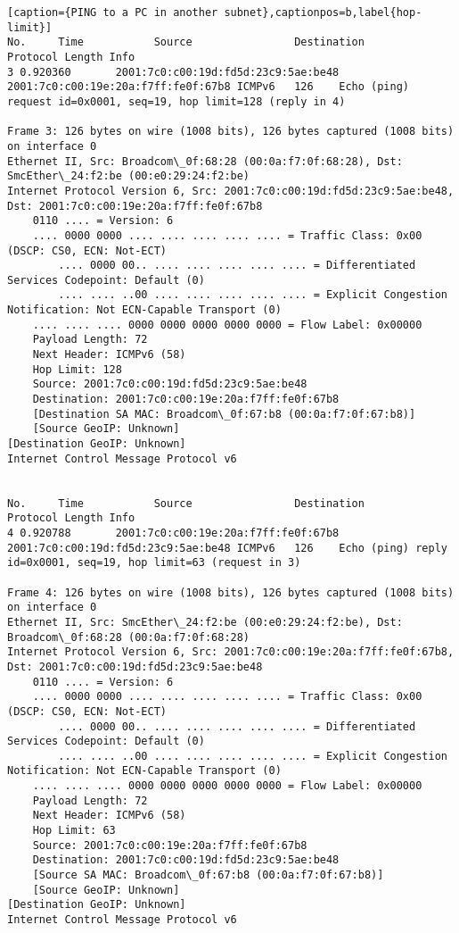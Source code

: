 \begin{lstlisting}[caption={PING to a PC in another subnet},captionpos=b,label{hop-limit}]
No.     Time           Source                Destination           Protocol Length Info
3 0.920360       2001:7c0:c00:19d:fd5d:23c9:5ae:be48 2001:7c0:c00:19e:20a:f7ff:fe0f:67b8 ICMPv6   126    Echo (ping) request id=0x0001, seq=19, hop limit=128 (reply in 4)

Frame 3: 126 bytes on wire (1008 bits), 126 bytes captured (1008 bits) on interface 0
Ethernet II, Src: Broadcom\_0f:68:28 (00:0a:f7:0f:68:28), Dst: SmcEther\_24:f2:be (00:e0:29:24:f2:be)
Internet Protocol Version 6, Src: 2001:7c0:c00:19d:fd5d:23c9:5ae:be48, Dst: 2001:7c0:c00:19e:20a:f7ff:fe0f:67b8
	0110 .... = Version: 6
	.... 0000 0000 .... .... .... .... .... = Traffic Class: 0x00 (DSCP: CS0, ECN: Not-ECT)
		.... 0000 00.. .... .... .... .... .... = Differentiated Services Codepoint: Default (0)
		.... .... ..00 .... .... .... .... .... = Explicit Congestion Notification: Not ECN-Capable Transport (0)
	.... .... .... 0000 0000 0000 0000 0000 = Flow Label: 0x00000
	Payload Length: 72
	Next Header: ICMPv6 (58)
	Hop Limit: 128
	Source: 2001:7c0:c00:19d:fd5d:23c9:5ae:be48
	Destination: 2001:7c0:c00:19e:20a:f7ff:fe0f:67b8
	[Destination SA MAC: Broadcom\_0f:67:b8 (00:0a:f7:0f:67:b8)]
	[Source GeoIP: Unknown]
[Destination GeoIP: Unknown]
Internet Control Message Protocol v6


No.     Time           Source                Destination           Protocol Length Info
4 0.920788       2001:7c0:c00:19e:20a:f7ff:fe0f:67b8 2001:7c0:c00:19d:fd5d:23c9:5ae:be48 ICMPv6   126    Echo (ping) reply id=0x0001, seq=19, hop limit=63 (request in 3)

Frame 4: 126 bytes on wire (1008 bits), 126 bytes captured (1008 bits) on interface 0
Ethernet II, Src: SmcEther\_24:f2:be (00:e0:29:24:f2:be), Dst: Broadcom\_0f:68:28 (00:0a:f7:0f:68:28)
Internet Protocol Version 6, Src: 2001:7c0:c00:19e:20a:f7ff:fe0f:67b8, Dst: 2001:7c0:c00:19d:fd5d:23c9:5ae:be48
	0110 .... = Version: 6
	.... 0000 0000 .... .... .... .... .... = Traffic Class: 0x00 (DSCP: CS0, ECN: Not-ECT)
		.... 0000 00.. .... .... .... .... .... = Differentiated Services Codepoint: Default (0)
		.... .... ..00 .... .... .... .... .... = Explicit Congestion Notification: Not ECN-Capable Transport (0)
	.... .... .... 0000 0000 0000 0000 0000 = Flow Label: 0x00000
	Payload Length: 72
	Next Header: ICMPv6 (58)
	Hop Limit: 63
	Source: 2001:7c0:c00:19e:20a:f7ff:fe0f:67b8
	Destination: 2001:7c0:c00:19d:fd5d:23c9:5ae:be48
	[Source SA MAC: Broadcom\_0f:67:b8 (00:0a:f7:0f:67:b8)]
	[Source GeoIP: Unknown]
[Destination GeoIP: Unknown]
Internet Control Message Protocol v6

\end{lstlisting}
